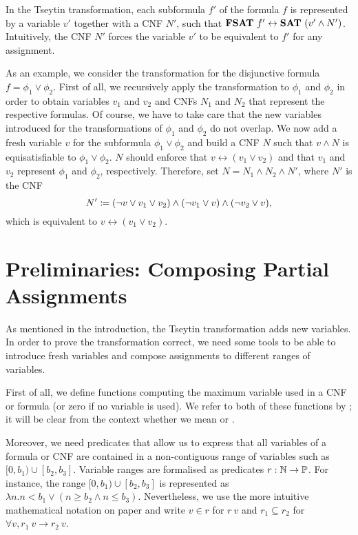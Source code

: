 In the Tseytin transformation, each subformula $f'$ of the formula $f$ is represented by a variable $v'$ together with a CNF $N'$, such that $\textbf{FSAT}{}~f' \leftrightarrow \textbf{SAT}{}~(v' \land N')$. Intuitively, the CNF $N'$ forces the variable $v'$ to be equivalent to $f'$ for any assignment.
\begin{example}
  As an example, we consider the transformation for the disjunctive formula $f = \phi_1 \lor \phi_2$. First of all, we recursively apply the transformation to $\phi_1$ and $\phi_2$ in order to obtain variables $v_1$ and $v_2$ and CNFs $N_1$ and $N_2$ that represent the respective formulas. Of course, we have to take care that the new variables introduced for the transformations of $\phi_1$ and $\phi_2$ do not overlap.
  We now add a fresh variable $v$ for the subformula $\phi_1 \lor \phi_2$ and build a CNF $N$ such that $v \land N$ is equisatisfiable to $\phi_1 \lor \phi_2$. $N$ should enforce that $v \leftrightarrow (v_1 \lor v_2)$ and that $v_1$ and $v_2$ represent $\phi_1$ and $\phi_2$, respectively.
  Therefore, set $N = N_1 \land N_2 \land N'$, where $N'$ is the CNF 
  \[ N' \coloneqq (\lnot v \lor v_1 \lor v_2) \land (\lnot v_1  \lor v) \land (\lnot v_2 \lor v), \]
  which is equivalent to $v \leftrightarrow (v_1 \lor v_2)$.
\end{example}

\section{Preliminaries: Composing Partial Assignments}\label{sec:tseytin_prelim}
As mentioned in the introduction, the Tseytin transformation adds new variables. In order to prove the transformation correct, we need some tools to be able to introduce fresh variables and compose assignments to different ranges of variables.

First of all, we define functions computing the maximum variable used in a CNF or formula (or zero if no variable is used). We refer to both of these functions by \mnotec{\maxVar{}}; it will be clear from the context whether we mean 
%
or . 

\newcommand{\inlit}{\ensuremath{\in_{\textsf{lit}}}}
\newcommand{\inclause}{\ensuremath{\in_{\textsf{clause}}}}
\newcommand{\incnf}{\ensuremath{\in_{\textsf{cnf}}}}
\newcommand{\infor}{\ensuremath{\in_{\formula}}}
Moreover, we need predicates that allow us to express that all variables of a formula
or CNF are contained in a non-contiguous range of variables such as $[0, b_1) \cup [b_2, b_3]$. 
Variable ranges are formalised as predicates $r : \mathbb{N} \rightarrow \mathbb{P}$. For instance, the range $[0, b_1) \cup [b_2, b_3]$ is represented as $\lambda n. n < b_1 \lor (n \ge b_2 \land n \le b_3)$. Nevertheless, we use the more intuitive mathematical notation on paper and write $v \in r$ for $r~v$ and $r_1 \subseteq r_2$ for $\forall v, r_1~v \rightarrow r_2~v$.

